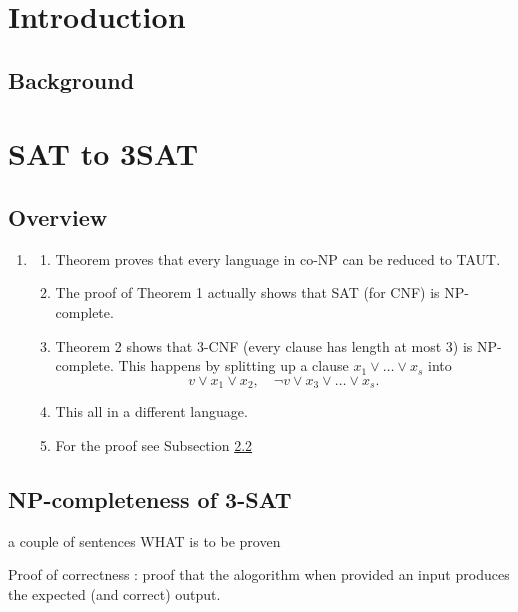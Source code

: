 \documentclass[a4paper]{report}
\begin{document}
\chapter {Introduction}
\label{cha:Introduction}

\section{Background}
\label{sec:Background}



\chapter{SAT to 3SAT}
\label{cha:sat13}


\section{Overview}
\label{sec:sat13Overview}

\begin{enumerate}
\item \cite{Cook1971NP}
  \begin{enumerate}
  \item Theorem proves that every language in co-NP can be reduced to TAUT.
  \item The proof of Theorem 1 actually shows that SAT (for CNF) is NP-complete.
  \item Theorem 2 shows that 3-CNF (every clause has length at most 3) is NP-complete. This happens by splitting up a clause $x_1 \vee \dots \vee x_s$ into
    \begin{displaymath}
      v \vee x_1 \vee x_2, \quad \neg v \vee x_3 \vee \dots \vee x_s.
    \end{displaymath}
  \item This all in a different language.
  \item For the proof see Subsection \ref{sec:3SATNPcomp}
  \end{enumerate}
\end{enumerate}



\section{NP-completeness of 3-SAT}
\label{sec:3SATNPcomp}

a couple of sentences WHAT is to be proven

Proof of correctness : proof that the alogorithm when provided an input produces the expected (and correct) output.
\end{document}

